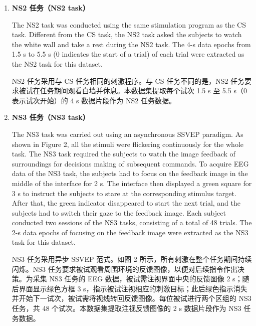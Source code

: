 \documentclass[11pt]{ctexart}
\newenvironment{en}{\begin{enbox}\color{black!85}}{\end{enbox}}
\newenvironment{zh}{\begin{zhbox}}{\end{zhbox}}
\begin{document}
\begin{enumerate}[label=\textbf{\arabic*.}]
\item \textbf{NS2 任务（NS2 task）}
\begin{en}
The NS2 task was conducted using the same stimulation program as the CS task. Different from the CS task, the NS2 task asked the subjects to watch the white wall and take a rest during the NS2 task. The 4-s data epochs from 1.5 s to 5.5 s (0 indicates the start of a trial) of each trial were extracted as the NS2 task for this dataset.
\end{en}
\begin{zh}
NS2 任务采用与 CS 任务相同的刺激程序。与 CS 任务不同的是，NS2 任务要求被试在任务期间观看白墙并休息。本数据集提取每个试次 1.5 s 至 5.5 s（0 表示试次开始）的 4 s 数据片段作为 NS2 任务数据。
\end{zh}

\item \textbf{NS3 任务（NS3 task）}
\begin{en}
The NS3 task was carried out using an asynchronous SSVEP paradigm. As shown in Figure 2, all the stimuli were flickering continuously for the whole task. The NS3 task required the subjects to watch the image feedback of surroundings for decisions making of subsequent commands. To acquire EEG data of the NS3 task, the subjects had to focus on the feedback image in the middle of the interface for 2 s. The interface then displayed a green square for 3 s to instruct the subjects to stare at the corresponding stimulus target. After that, the green indicator disappeared to start the next trial, and the subjects had to switch their gaze to the feedback image. Each subject conducted two sessions of the NS3 tasks, consisting of a total of 48 trials. The 2-s data epochs of focusing on the feedback image were extracted as the NS3 task for this dataset.
\end{en}
\begin{zh}
NS3 任务采用异步 SSVEP 范式。如图 2 所示，所有刺激在整个任务期间持续闪烁。NS3 任务要求被试观看周围环境的反馈图像，以便对后续指令作出决策。为采集 NS3 任务的 EEG 数据，被试需注视界面中央的反馈图像 2 s；随后界面显示绿色方框 3 s，指示被试注视相应的刺激目标；此后绿色指示消失并开始下一试次，被试需将视线转回反馈图像。每位被试进行两个区组的 NS3 任务，共 48 个试次。本数据集提取注视反馈图像的 2 s 数据片段作为 NS3 任务数据。
\end{zh}
\end{enumerate}
\end{document}
